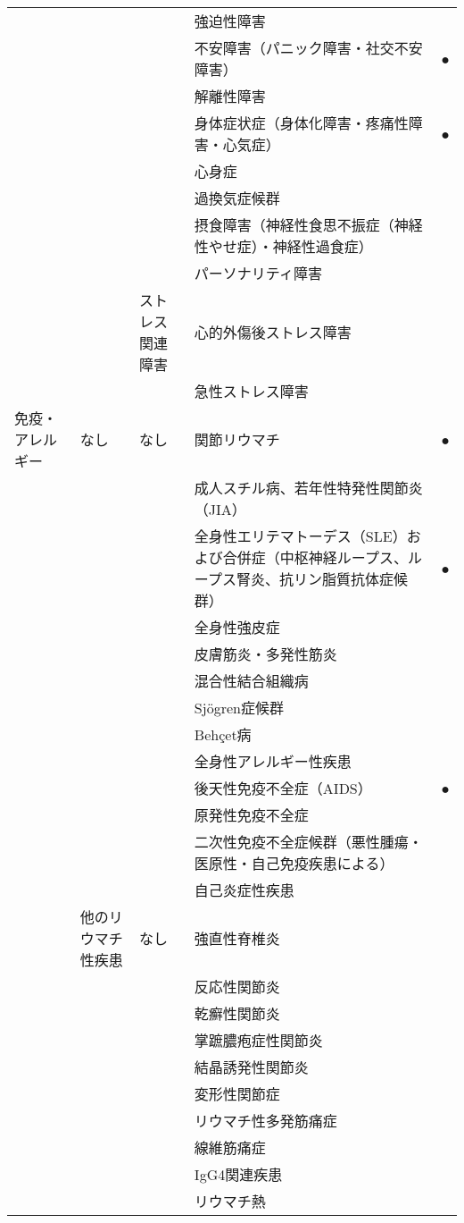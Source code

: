 \begin{xltabular}{\linewidth}{XXXXX}
 &  &  & 強迫性障害 &  \\
 &  &  & 不安障害（パニック障害・社交不安障害） & ● \\
 &  &  & 解離性障害 &  \\
 &  &  & 身体症状症（身体化障害・疼痛性障害・心気症） & ● \\
 &  &  & 心身症 &  \\
 &  &  & 過換気症候群 &  \\
 &  &  & 摂食障害（神経性食思不振症（神経性やせ症）・神経性過食症） &  \\
 &  &  & パーソナリティ障害 &  \\
 &  & ストレス関連障害 & 心的外傷後ストレス障害 &  \\
 &  &  & 急性ストレス障害 &  \\
免疫・アレルギー & なし & なし & 関節リウマチ & ● \\
 &  &  & 成人スチル病、若年性特発性関節炎（JIA） &  \\
 &  &  & 全身性エリテマトーデス（SLE）および合併症（中枢神経ループス、ループス腎炎、抗リン脂質抗体症候群） & ● \\
 &  &  & 全身性強皮症 &  \\
 &  &  & 皮膚筋炎・多発性筋炎 &  \\
 &  &  & 混合性結合組織病 &  \\
 &  &  & Sjögren症候群 &  \\
 &  &  & Behçet病 &  \\
 &  &  & 全身性アレルギー性疾患 &  \\
 &  &  & 後天性免疫不全症（AIDS） & ● \\
 &  &  & 原発性免疫不全症 &  \\
 &  &  & 二次性免疫不全症候群（悪性腫瘍・医原性・自己免疫疾患による） &  \\
 &  &  & 自己炎症性疾患 &  \\
 & 他のリウマチ性疾患 & なし & 強直性脊椎炎 &  \\
 &  &  & 反応性関節炎 &  \\
 &  &  & 乾癬性関節炎 &  \\
 &  &  & 掌蹠膿疱症性関節炎 &  \\
 &  &  & 結晶誘発性関節炎 &  \\
 &  &  & 変形性関節症 &  \\
 &  &  & リウマチ性多発筋痛症 &  \\
 &  &  & 線維筋痛症 &  \\
 &  &  & IgG4関連疾患 &  \\
 &  &  & リウマチ熱 &  \\

\end{xltabular}
